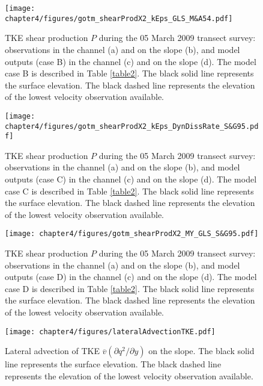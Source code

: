 \begin{figure}[t]
  \noindent
  \texttt{[image: chapter4/figures/gotm\_shearProdX2\_kEps\_GLS\_M\&A54.pdf]}\\
  \caption{TKE shear production $P$ during the 05 March 2009 transect survey: observations in the channel (a) and on the slope (b), and model outputs (case B) in the channel (c) and on the slope (d). The model case B is described in Table \ref{table2}. The black solid line represents the surface elevation. The black dashed line represents the elevation of the lowest velocity observation available.}
  \label{gotmCaseBX2}
\end{figure}

\begin{figure}[t]
  \noindent
  \texttt{[image: chapter4/figures/gotm\_shearProdX2\_kEps\_DynDissRate\_S\&G95.pdf]}\\
  \caption{TKE shear production $P$ during the 05 March 2009 transect survey: observations in the channel (a) and on the slope (b), and model outputs (case C) in the channel (c) and on the slope (d). The model case C is described in Table \ref{table2}. The black solid line represents the surface elevation. The black dashed line represents the elevation of the lowest velocity observation available.}
  \label{gotmCaseCX2}
\end{figure}

\begin{figure}[t]
  \noindent
  \texttt{[image: chapter4/figures/gotm\_shearProdX2\_MY\_GLS\_S\&G95.pdf]}\\
  \caption{TKE shear production $P$ during the 05 March 2009 transect survey: observations in the channel (a) and on the slope (b), and model outputs (case D) in the channel (c) and on the slope (d). The model case D is described in Table \ref{table2}. The black solid line represents the surface elevation. The black dashed line represents the elevation of the lowest velocity observation available.}
  \label{gotmCaseDX2}
\end{figure}

\begin{figure}[t]
  \noindent
  \texttt{[image: chapter4/figures/lateralAdvectionTKE.pdf]}\\
  \caption{Lateral advection of TKE $\overline{v} (\partial q^2 / \partial y)$ on the slope. The black solid line represents the surface elevation. The black dashed line represents the elevation of the lowest velocity observation available.}
  \label{gotmLateralAdvection}
\end{figure}


